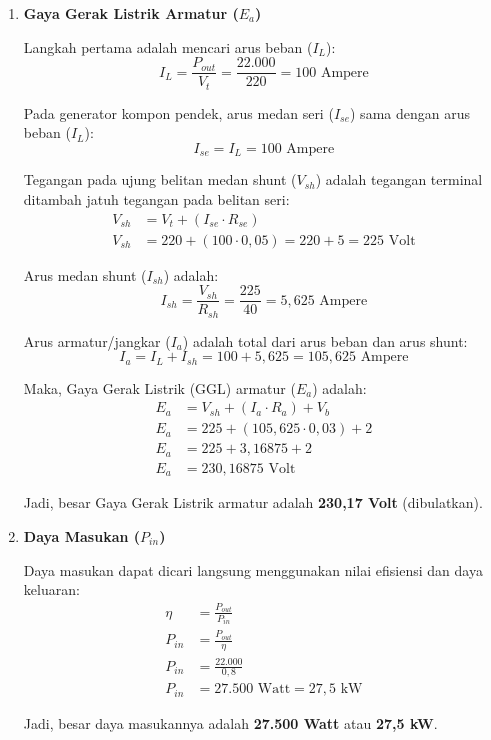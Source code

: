 \documentclass[12pt, a4paper]{article}
\begin{document}
\begin{enumerate}[label=\alph*.]
    \item \textbf{Gaya Gerak Listrik Armatur ($E_a$)}

    Langkah pertama adalah mencari arus beban ($I_L$):
    \[
        I_L = \frac{P_{out}}{V_t} = \frac{22.000}{220} = 100 \text{ Ampere}
    \]

    Pada generator kompon pendek, arus medan seri ($I_{se}$) sama dengan arus beban ($I_L$):
    \[
        I_{se} = I_L = 100 \text{ Ampere}
    \]

    Tegangan pada ujung belitan medan shunt ($V_{sh}$) adalah tegangan terminal ditambah jatuh tegangan pada belitan seri:
    \begin{align*}
        V_{sh} &= V_t + (I_{se} \cdot R_{se}) \\
        V_{sh} &= 220 + (100 \cdot 0,05) = 220 + 5 = 225 \text{ Volt}
    \end{align*}

    Arus medan shunt ($I_{sh}$) adalah:
    \[
        I_{sh} = \frac{V_{sh}}{R_{sh}} = \frac{225}{40} = 5,625 \text{ Ampere}
    \]

    Arus armatur/jangkar ($I_a$) adalah total dari arus beban dan arus shunt:
    \[
        I_a = I_L + I_{sh} = 100 + 5,625 = 105,625 \text{ Ampere}
    \]

    Maka, Gaya Gerak Listrik (GGL) armatur ($E_a$) adalah:
    \begin{align*}
        E_a &= V_{sh} + (I_a \cdot R_a) + V_b \\
        E_a &= 225 + (105,625 \cdot 0,03) + 2 \\
        E_a &= 225 + 3,16875 + 2 \\
        E_a &= 230,16875 \text{ Volt}
    \end{align*}

    Jadi, besar Gaya Gerak Listrik armatur adalah \textbf{230,17 Volt} (dibulatkan).

    \item \textbf{Daya Masukan ($P_{in}$)}

    Daya masukan dapat dicari langsung menggunakan nilai efisiensi dan daya keluaran:
    \begin{align*}
        \eta &= \frac{P_{out}}{P_{in}} \\
        P_{in} &= \frac{P_{out}}{\eta} \\
        P_{in} &= \frac{22.000}{0,8} \\
        P_{in} &= 27.500 \text{ Watt} = 27,5 \text{ kW}
    \end{align*}

    Jadi, besar daya masukannya adalah \textbf{27.500 Watt} atau \textbf{27,5 kW}.
\end{enumerate}
\end{document}

